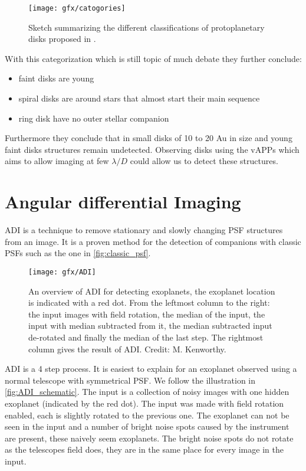 \begin{figure}[H]
    \caption{Sketch summarizing the different classifications of protoplanetary disks proposed in \cite{garufi}.}
    \centering
    \texttt{[image: gfx/catogories]}
    \label{fig:sketch_garufi}
\end{figure}

With this categorization which is still topic of much debate they \cite{garufi} further conclude:
\begin{itemize}
    \item faint disks are young
    \item spiral disks are around stars that almost start their main sequence
    \item ring disk have no outer stellar companion %
\end{itemize}

Furthermore they \cite{garufi} conclude that in small disks of 10 to 20 Au in size and young faint disks structures remain undetected. Observing disks using the \acp{vAPP} which aims to allow imaging at few $\lambda/D$ could allow us to detect these structures.

\section{Angular differential Imaging}
\label{sec:adi}
\ac{ADI} \cite{marois_2005} is a technique to remove stationary and slowly changing PSF structures from an image. It is a proven method for the detection of companions with classic \acp{PSF} such as the one in \autoref{fig:classic_psf}. %

\begin{figure}[H]
    \texttt{[image: gfx/ADI]}
    \caption{An overview of \ac{ADI} for detecting exoplanets, the exoplanet location is indicated with a red dot. From the leftmost column to the right: the input images with field rotation, the median of the input, the input with median subtracted from it, the median subtracted input de-rotated and finally the median of the last step. The rightmost column gives the result of ADI. Credit: M. Kenworthy.}
    \label{fig:ADI_schematic}
\end{figure}

\ac{ADI} is a 4 step process. It is easiest to explain for an exoplanet observed using a normal telescope with symmetrical \ac{PSF}. We follow the illustration in \autoref{fig:ADI_schematic}. The input is a collection of noisy images with one hidden exoplanet (indicated by the red dot). The input was made with field rotation enabled, each is slightly rotated to the previous one. The exoplanet can not be seen in the input and a number of bright noise spots caused by the instrument are present, these naively seem exoplanets. The bright noise spots do not rotate as the telescopes field does, they are in the same place for every image in the input.

